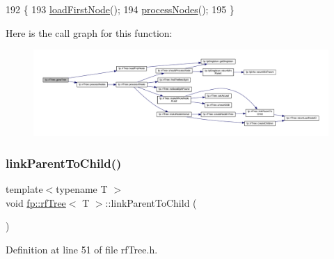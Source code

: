 \begin{DoxyCode}
192                                \{
193                     \hyperlink{classfp_1_1rfTree_a8757adc28b68d0a99f95b8bc5d6a38db}{loadFirstNode}();
194                     \hyperlink{classfp_1_1rfTree_a7997df3477bc9f73163384c8cd0bcec9}{processNodes}();
195                 \}
\end{DoxyCode}
Here is the call graph for this function\+:
\nopagebreak
\begin{figure}[H]
\begin{center}
\leavevmode
\includegraphics[width=350pt]{classfp_1_1rfTree_a196d6006e7e2ee0575fa40d7d4621712_cgraph}
\end{center}
\end{figure}
\mbox{\label{classfp_1_1rfTree_aceaedc5d54bb429c1a3539f164a93d45}} 
\subsubsection{\texorpdfstring{link\+Parent\+To\+Child()}{linkParentToChild()}\hspace{0.1cm}{\footnotesize\ttfamily [1/2]}}
{\footnotesize\ttfamily template$<$typename T $>$ \\
void \hyperlink{classfp_1_1rfTree}{fp\+::rf\+Tree}$<$ T $>$\+::link\+Parent\+To\+Child (\begin{DoxyParamCaption}{ }\end{DoxyParamCaption})\hspace{0.3cm}{\ttfamily [inline]}}



Definition at line 51 of file rf\+Tree.\+h.


